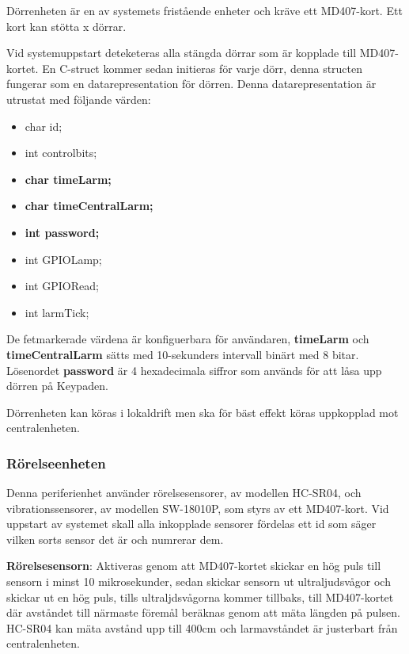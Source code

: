 \documentclass{article}
\begin{document}
Dörrenheten är en av systemets fristående enheter och kräve ett MD407-kort. Ett kort kan stötta x dörrar.

Vid systemuppstart deteketeras alla stängda dörrar som är kopplade till MD407-kortet. En C-struct kommer sedan initieras för varje dörr, denna structen fungerar som en datarepresentation för dörren. Denna datarepresentation är utrustat med följande värden:
\begin{itemize}
  \item {char id;}
  \item {int controlbits;} 
  \item \textbf{char time\textunderscore{}Larm;}
  \item \textbf{char time\textunderscore{}Central\textunderscore{}Larm;}
  \item \textbf{int password;}
  \item int GPIO\textunderscore{}Lamp;
  \item int GPIO\textunderscore{}Read;
  \item int larmTick;
\end{itemize}

De fetmarkerade värdena är konfiguerbara för användaren, \textbf{time\textunderscore{}Larm} och \\ \textbf{time\textunderscore{}Central\textunderscore{}Larm} sätts med 10-sekunders intervall binärt med 8 bitar. Lösenordet \textbf{password} är 4 hexadecimala siffror som används för att låsa upp dörren på Keypaden.

Dörrenheten kan köras i lokaldrift
men ska för bäst effekt köras uppkopplad mot centralenheten.\\
\subsubsection{Rörelseenheten}
Denna periferienhet använder rörelsesensorer, av modellen HC-SR04, och vibrationssensorer, av modellen SW-18010P, som styrs av ett MD407-kort. 
Vid uppstart av systemet skall alla inkopplade sensorer fördelas ett id som säger vilken sorts sensor det är och numrerar dem.

\textbf{Rörelsesensorn}: Aktiveras genom att MD407-kortet skickar en hög puls till sensorn i minst 10 mikrosekunder, sedan skickar sensorn ut ultraljudsvågor och skickar ut en hög puls, tills ultraljdsvågorna kommer tillbaks,  till MD407-kortet där avståndet till närmaste föremål beräknas genom att mäta längden på pulsen. HC-SR04 kan mäta avstånd upp till 400cm och larmavståndet är justerbart från centralenheten.
\end{document}
